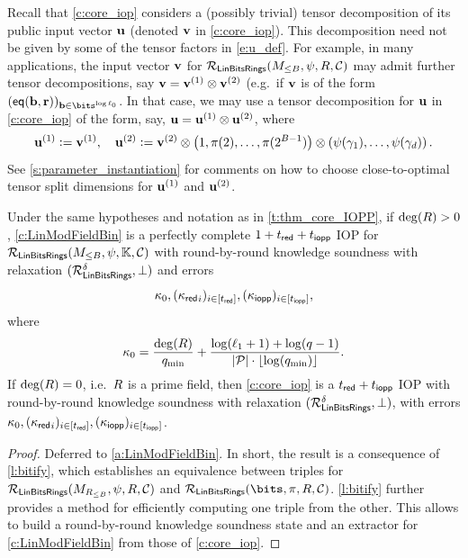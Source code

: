 \documentclass[11pt,letterpaper,usenames,dvipsnames]{article}
\begin{document}
\begin{remark}\label{r:tensor_dec_u}
Recall that \cref{c:core_iop} considers a (possibly trivial) tensor decomposition of its public input vector $\mathbf{u}$ (denoted $\mathbf{v}$ in \cref{c:core_iop}). This decomposition need not be given by some of the tensor factors in \cref{e:u_def}. For example, in many applications, the input vector $\mathbf{v}$ for $\mathcal{R}_{\mathsf{LinBitsRings}}(M_{\leq B},\psi, R,  \mathcal{C})$ may admit further tensor decompositions, say $\mathbf{v}=\mathbf{v}^{(1)}\otimes \mathbf{v}^{(2)}$ (e.g.\ if $\mathbf{v}$ is of the form $(\eq(\bb,\rr))_{\bb\in\bits^{\log \codedim_0}}$. In that case, we may use a tensor decomposition for $\mathbf{u}$ in \cref{c:core_iop} of the form, say, $\mathbf{u}=\mathbf{u}^{(1)}\otimes \mathbf{u}^{(2)}$, where
%
$$
\mathbf{u}^{(1)} {\;\vcentcolon=\;} \mathbf{v}^{(1)},\quad \mathbf{u}^{(2)}{\;\vcentcolon=\;} \mathbf{v}^{(2)}\otimes \left(1, \pi(2), \ldots, \pi(2^{B-1})\right) \otimes \left(\psi(\gamma_1), \ldots, \psi(\gamma_{d})\right).
$$
See \cref{s:parameter_instantiation} for comments on how to choose close-to-optimal tensor split dimensions for $\mathbf{u}^{(1)}$ and $\mathbf{u}^{(2)}$.
\end{remark}

\begin{theorem}\label{t:thm_LinModFieldBits}
    Under the same hypotheses and notation as in \cref{t:thm_core_IOPP}, if $\deg(R)>0$, \cref{c:LinModFieldBin} is a perfectly complete $1+t_{\mathsf{red}} + t_{\mathsf{iopp}}$ IOP for $\mathcal{R}_{\mathsf{LinBitsRings}}(M_{\leq B},\psi, \mathbb{K}, \mathcal{C})$ with round-by-round knowledge soundness with relaxation $(\mathcal{R}_{\mathsf{LinBitsRings}}^{\delta},\bot)$ and errors $$\kappa_0, ({\kappa_{\mathsf{red}}}_i)_{i\in [t_{\mathsf{red}}]}, ({\kappa_{\mathsf{iopp}}})_{i\in [t_{\mathsf{iopp}}]},$$ where $$
    \kappa_0 = \frac{\deg(R)}{q_{\min}} + \frac{\log(\ell_1 +1) + \log(q-1)}{|\mathcal{P}|\cdot \lfloor\log(q_{\min})\rfloor}.
    $$
    If $\deg(R)=0$, i.e.\ $R$ is a prime field, then \cref{c:core_iop} is a $t_{\mathsf{red}}+t_{\mathsf{iopp}}$ IOP with round-by-round knowledge soundness with relaxation $(\mathcal{R}_{\mathsf{LinBitsRings}}^\delta, \bot)$, with errors $\kappa_0, ({\kappa_{\mathsf{red}}}_i)_{i\in [t_{\mathsf{red}}]}, ({\kappa_{\mathsf{iopp}}})_{i\in [t_{\mathsf{iopp}}]}$.
\end{theorem}
\begin{proof} Deferred to \cref{a:LinModFieldBin}. In short, the result is a consequence of \cref{l:bitify}, which establishes an equivalence between  triples for $\mathcal{R}_{\mathsf{LinBitsRings}}(M_{R_{\leq B}},\psi, R, \mathcal{C})$ and $\LinBitsDual(\bits,\ringmorphism, R,\cC)$. \cref{l:bitify} further provides a method for efficiently computing one triple from the other. This allows to build a round-by-round knowledge soundness state and an extractor for \cref{c:LinModFieldBin} from those of \cref{c:core_iop}.
\end{proof}
\end{document}
